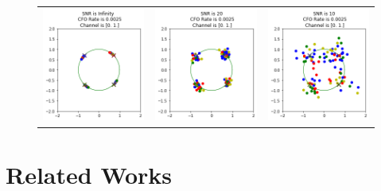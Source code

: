 \begin{figure}
\begin{tabular}{ccc}
    \includegraphics[width=45mm]{figures/cfo_equal_intro/snr_0_c5/cfo_0.png}&
    \includegraphics[width=45mm]{figures/cfo_equal_intro/snr_20_c5/cfo_0.png}&
    \includegraphics[width=45mm]{figures/cfo_equal_intro/snr_10_c5/cfo_0.png}\\
  \end{tabular}
\end{figure}

\section{Related Works}

